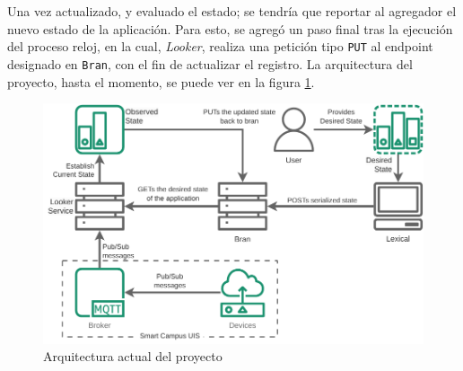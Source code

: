 Una vez actualizado, y evaluado el estado; se tendría que reportar al agregador el nuevo estado de la aplicación. Para esto, se agregó un paso final tras la ejecución del proceso reloj, en la cual, \textit{Looker}, realiza una petición tipo \texttt{PUT} al endpoint designado en \texttt{Bran}, con el fin de actualizar el registro. La arquitectura del proyecto, hasta el momento, se puede ver en la figura \ref{fig:StarDuckBasic}.

\begin{figure}[ht]
    \centering
    \caption{Arquitectura actual del proyecto}
    \label{fig:StarDuckBasic}
    \includegraphics[width=0.8\linewidth]{images/StarDuckBasic.pdf}
\end{figure}


